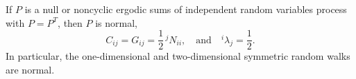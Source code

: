 If $P$ is a null or noncyclic ergodic sums of independent random variables process with $P = P^T$, then $P$ is normal,
$$C_{ij} = G_{ij} = \frac{1}{2}\,{}^jN_{ii}, \quad \text{and} \quad {}^i\lambda_j = \frac{1}{2}.$$
In particular, the one-dimensional and two-dimensional symmetric random walks are normal.
